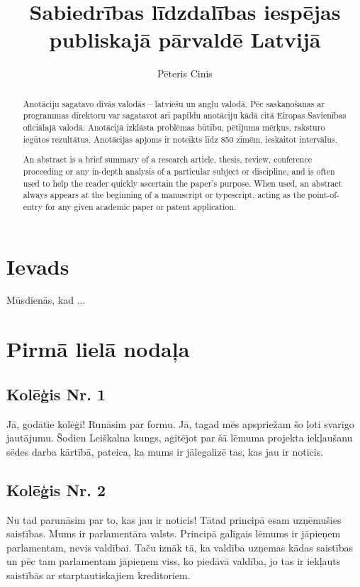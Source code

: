 \documentclass{LU-nosleguma}
\title{Sabiedrības līdzdalības iespējas publiskajā pārvaldē Latvijā}
\author{Pēteris Cinis}
\begin{document}
\maketitle


\begin{abstract}
Anotāciju sagatavo divās valodās – latviešu un angļu valodā. Pēc saskaņošanas ar programmas 
direktoru var sagatavot arī papildu anotāciju kādā citā Eiropas Savienības oficiālajā valodā. 
Anotācijā izklāsta problēmas būtību, pētījuma mērķus, raksturo iegūtos rezultātus. 
Anotācijas apjoms ir noteikts līdz 850 zīmēm, ieskaitot intervālus.
\end{abstract}
\clearpage

\begin{abstract}
An abstract is a brief summary of a research article, thesis, review, conference proceeding or any 
in-depth analysis of a particular subject or discipline, and is often used to help the reader quickly 
ascertain the paper's purpose. When used, an abstract always appears at the beginning of a 
manuscript or typescript, acting as the point-of-entry for any given academic paper or 
patent application. 
\end{abstract}
\clearpage
{}


\tableofcontents


\section*{Ievads}
Mūsdienās, kad ... \cite{darktome}


\section {Pirmā lielā nodaļa}
\subsection {Kolēģis Nr. 1}
Jā, godātie kolēģi! Runāsim par formu. Jā, tagad mēs apspriežam šo ļoti svarīgo jautājumu. Šodien Leiškalna kungs, 
aģitējot par šā lēmuma projekta iekļaušanu sēdes darba kārtībā, pateica, ka mums ir jālegalizē tas, kas jau ir noticis.

\subsection {Kolēģis Nr. 2}
Nu tad parunāsim par to, kas jau ir noticis! Tātad principā esam uzņēmušies saistības. Mums ir parlamentāra valsts.
Principā galīgais lēmums ir jāpieņem parlamentam, nevis valdībai. Taču iznāk tā, ka valdība uzņemas kādas saistības 
un pēc tam parlamentam jāpieņem viss, ko piedāvā valdība, jo tas ir iekļauts saistībās ar starptautiskajiem kreditoriem.
\end{document}

